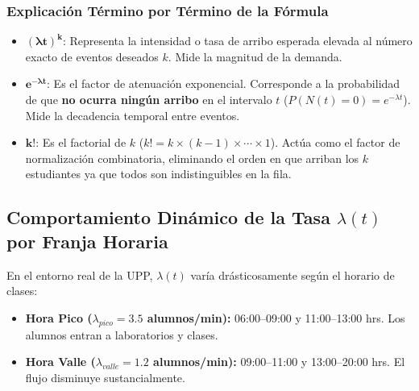 \documentclass[12pt,letterpaper]{article}
\begin{document}
\subsubsection{Explicación Término por Término de la Fórmula}
\begin{itemize}
	\item $\mathbf{(\lambda t)^k}$: Representa la intensidad o tasa de arribo esperada elevada al número exacto de eventos deseados $k$. Mide la magnitud de la demanda.
	\item $\mathbf{e^{-\lambda t}}$: Es el factor de atenuación exponencial. Corresponde a la probabilidad de que \textbf{no ocurra ningún arribo} en el intervalo $t$ ($P(N(t)=0) = e^{-\lambda t}$). Mide la decadencia temporal entre eventos.
	\item $\mathbf{k!}$: Es el factorial de $k$ ($k! = k \times (k-1) \times \cdots \times 1$). Actúa como el factor de normalización combinatoria, eliminando el orden en que arriban los $k$ estudiantes ya que todos son indistinguibles en la fila.
\end{itemize}

\subsection{Comportamiento Dinámico de la Tasa \texorpdfstring{$\lambda(t)$}{lambda(t)} por Franja Horaria}
En el entorno real de la UPP, $\lambda(t)$ varía drásticosamente según el horario de clases:
\begin{itemize}
	\item \textbf{Hora Pico ($\lambda_{pico} = 3.5$ alumnos/min):} 06:00--09:00 y 11:00--13:00 hrs. Los alumnos entran a laboratorios y clases.
	\item \textbf{Hora Valle ($\lambda_{valle} = 1.2$ alumnos/min):} 09:00--11:00 y 13:00--20:00 hrs. El flujo disminuye sustancialmente.
\end{itemize}
\end{document}
